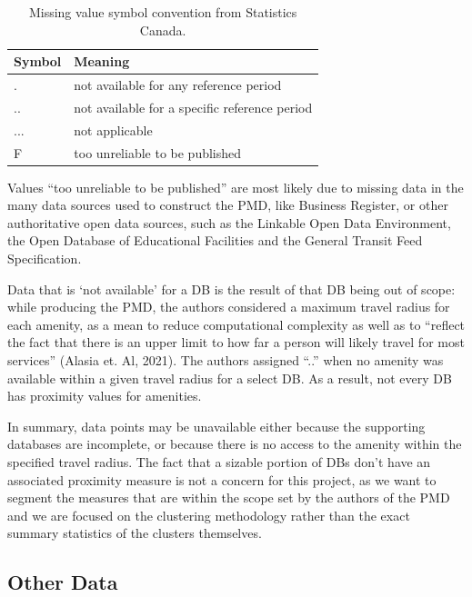 \documentclass[11pt, a4paper]{article}
\begin{document}
\begin{table}[H]
\centering
\caption[Missing value symbols]{Missing value symbol convention from Statistics Canada.}\label{missingvalues}
\begin{tabular}{|l|l|} 
\hline
\textbf{Symbol} & \textbf{Meaning} \\
\hline
. & not available for any reference period \\ 
\hline 
.. & not available for a specific reference period \\ 
\hline 
... & not applicable \\ 
\hline 
F & too unreliable to be published \\ 
\hline 
\end{tabular}
\end{table}




Values ``too unreliable to be published'' are most likely due to missing data in the many data sources used to construct the PMD, like Business Register, or other authoritative open data sources, such as the Linkable Open Data Environment, the Open Database of Educational Facilities and the General Transit Feed Specification.
\par
Data that is `not available' for a DB is the result of that DB being out of scope: while producing the PMD, the authors considered a maximum travel radius for each amenity, as a mean to reduce computational complexity as well as to ``reflect the fact that there is an upper limit to how far a person will likely travel for most services'' (Alasia et. Al, 2021). The authors assigned ``..'' when no amenity was available within a given travel radius for a select DB. As a result, not every DB has proximity values for amenities. 
\par
In summary, data points may be unavailable either because the supporting databases are incomplete, or because there is no access to the amenity within the specified travel radius. The fact that a sizable portion of DBs don’t have an associated proximity measure is not a concern for this project, as we want to segment the measures that are within the scope set by the authors of the PMD and we are focused on the clustering methodology rather than the exact summary statistics of the clusters themselves.








\subsection{Other Data}
\end{document}
